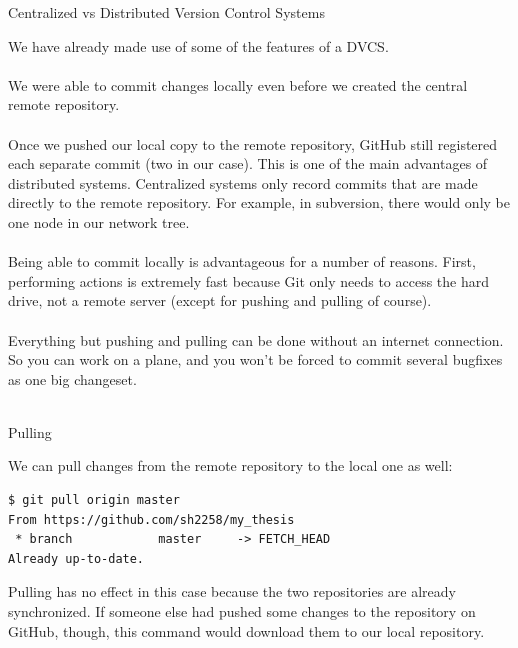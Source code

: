 \documentclass[10pt]{beamer}
\begin{document}
\begin{frame}[fragile]{Centralized vs Distributed Version Control Systems}

We have already made use of some of the features of a DVCS.\\~\\

We were able to commit changes locally even before we created the central remote repository.\\~\\

Once we pushed our local copy to the remote repository, GitHub still registered each separate commit (two in our case). This is one of the main advantages of distributed systems. Centralized systems only record commits that are made directly to the remote repository. For example, in subversion, there would only be one node in our network tree.\\~\\

Being able to commit locally is advantageous for a number of reasons. First, performing actions is extremely fast because Git only needs to access the hard drive, not a remote server (except for pushing and pulling of course).\\~\\

Everything but pushing and pulling can be done without an internet connection. So you can work on a plane, and you won't be forced to commit several bugfixes as one big changeset.\\~\\


\end{frame}

\begin{frame}[fragile]{Pulling}


We can pull changes from the remote repository to the local one as well:

\begin{lstlisting}
$ git pull origin master
From https://github.com/sh2258/my_thesis
 * branch            master     -> FETCH_HEAD
Already up-to-date.
\end{lstlisting}
Pulling has no effect in this case because the two repositories are already synchronized. If someone else had pushed some changes to the repository on GitHub, though, this command would download them to our local repository.\\

\end{frame}
\end{document}
